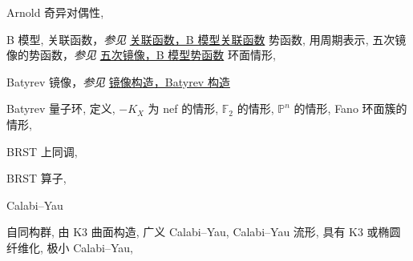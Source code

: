 \begin{theindex}
\indexspace
\item \leavevmode\hypertarget{idx:0054}{Arnold 奇异对偶性},\enspace{}
\indexspace
\item \leavevmode\hypertarget{idx:0062}{B 模型},\enspace{}
\subitem \leavevmode\hypertarget{idx:0063}{关联函数}，\textit{参见} \hyperlink{idx:0189}{关联函数，B 模型关联函数}
\subitem \leavevmode\hypertarget{idx:0064}{势函数},\enspace{}
\subsubitem \leavevmode\hypertarget{idx:0065}{用周期表示},\enspace{}
\subsubitem \leavevmode\hypertarget{idx:0066}{五次镜像的势函数}，\textit{参见} \hyperlink{idx:1168}{五次镜像，B 模型势函数}
\subitem \leavevmode\hypertarget{idx:0067}{环面情形},\enspace{}
\indexspace
\item \leavevmode\hypertarget{source:477}{}\hypertarget{idx:0068}{Batyrev 镜像}，\textit{参见} \hyperlink{idx:0799}{镜像构造，Batyrev 构造}
\indexspace
\item \leavevmode\hypertarget{idx:0069}{Batyrev 量子环},\enspace{}
\subitem \leavevmode\hypertarget{idx:0070}{定义},\enspace{}
\subitem \leavevmode\hypertarget{idx:0071}{$-K_X$ 为 nef 的情形},\enspace{}
\subitem \leavevmode\hypertarget{idx:0072}{$\mathbb F_2$ 的情形},\enspace{}
\subitem \leavevmode\hypertarget{idx:0073}{$\mathbb P^n$ 的情形},\enspace{}
\subitem \leavevmode\hypertarget{idx:0074}{Fano 环面簇的情形},\enspace{}
\indexspace
\item \leavevmode\hypertarget{idx:0085}{BRST 上同调},\enspace{}
\indexspace
\item \leavevmode\hypertarget{idx:0086}{BRST 算子},\enspace{}
\indexspace
\item \leavevmode\hypertarget{idx:0087}{Calabi--Yau}
\subitem \leavevmode\hypertarget{idx:0088}{自同构群},\enspace{}
\subitem \leavevmode\hypertarget{idx:0089}{由 K3 曲面构造},\enspace{}
\subitem \leavevmode\hypertarget{idx:0090}{广义 Calabi--Yau},\enspace{}
\subitem \leavevmode\hypertarget{idx:0091}{Calabi--Yau 流形},\enspace{}
\subsubitem \leavevmode\hypertarget{idx:0092}{具有 K3 或椭圆纤维化},\enspace{}
\subitem \leavevmode\hypertarget{idx:0093}{极小 Calabi--Yau},\enspace{}

\end{theindex}

